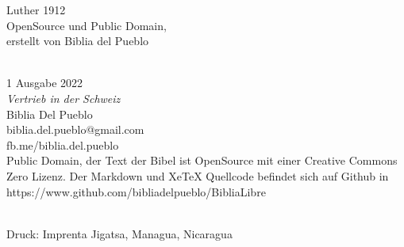 \hfill\break
Luther 1912\\
OpenSource und Public Domain,\\
erstellt von Biblia del Pueblo\\
\strut \\
1 Ausgabe 2022~\\
\emph{Vertrieb in der Schweiz}\\
Biblia Del Pueblo\\
biblia.del.pueblo@gmail.com\\
fb.me/biblia.del.pueblo~\\
Public Domain, der Text der Bibel ist OpenSource mit einer Creative
Commons Zero Lizenz. Der Markdown und XeTeX Quellcode befindet sich auf
Github in\\
https://www.github.com/bibliadelpueblo/BibliaLibre\\
\strut \\
Druck: Imprenta Jigatsa, Managua, Nicaragua\\
